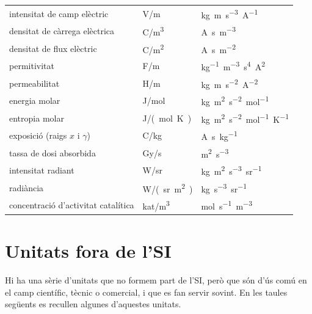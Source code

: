 \begin{longtable}[h]{lll}
   intensitat de camp elèctric & \unit{V/m}& \unit{kg.m.s^{-3}.A^{-1}}  \\
   densitat de càrrega elèctrica & \unit{C/m^3} & \unit{A.s.m^{-3}} \\
   densitat de flux elèctric & \unit{C/m^2} & \unit{A.s.m^{-2}}\\
   permitivitat &  \unit{F/m}& \unit{kg^{-1}.m^{-3}.s^4.A^2} \\
   permeabilitat &  \unit{H/m} & \unit{kg.m.s^{-2}.A^{-2}} \\
   energia molar & \unit{J/mol} & \unit{kg.m^2.s^{-2}.mol^{-1}} \\
   entropia molar& \unit{J/(mol.K)} & \unit{kg.m^2.s^{-2}.mol^{-1}.K^{-1}} \\
   exposició (raigs $x$ i $\gamma$) & \unit{C/kg} & \unit{A.s.kg^{-1}} \\
   tassa de dosi absorbida & \unit{Gy/s} & \unit{m^2.s^{-3}}\\
   intensitat radiant & \unit{W/sr} & \unit{kg.m^2.s^{-3}.sr^{-1}} \\
   radiància & \unit{W/(sr.m^2)} & \unit{kg.s^{-3}.sr^{-1}} \\
   concentració d'activitat catalítica &  \unit{kat/m^3} & \unit{mol.s^{-1}.m^{-3}}\\
    \bottomrule[1pt]
\end{longtable}



\section{Unitats fora de l'SI}\label{sec:unitats-fora-SI}

Hi ha una sèrie d'unitats que no formem part de l'SI, però que són d'ús comú en el camp científic, tècnic o comercial, i que es fan servir sovint. En les taules següents es recullen algunes d'aquestes unitats.

